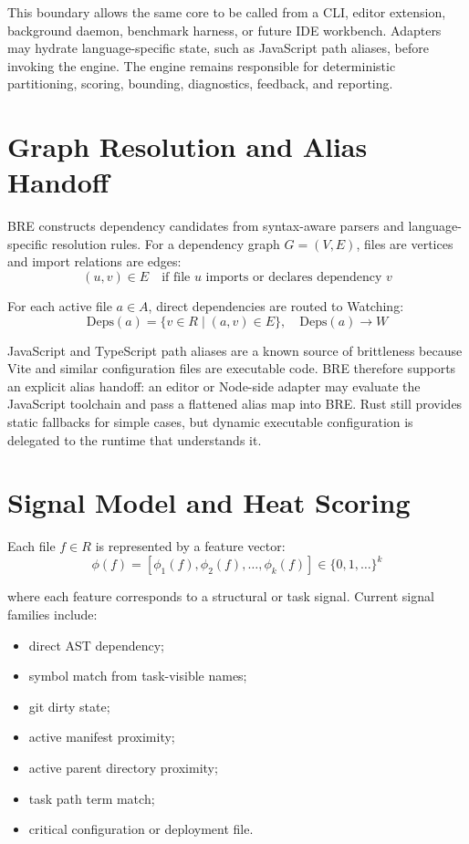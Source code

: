 \documentclass[10pt,twocolumn,letterpaper]{article}
\begin{document}
This boundary allows the same core to be called from a CLI, editor extension, background daemon, benchmark harness, or future IDE workbench. Adapters may hydrate language-specific state, such as JavaScript path aliases, before invoking the engine. The engine remains responsible for deterministic partitioning, scoring, bounding, diagnostics, feedback, and reporting.

\section{Graph Resolution and Alias Handoff}
BRE constructs dependency candidates from syntax-aware parsers and language-specific resolution rules. For a dependency graph $G=(V,E)$, files are vertices and import relations are edges:
\begin{equation}
(u,v) \in E \quad \text{if file } u \text{ imports or declares dependency } v
\end{equation}

For each active file $a \in A$, direct dependencies are routed to Watching:
\begin{equation}
\text{Deps}(a) = \{v \in R \mid (a,v) \in E\}, \quad \text{Deps}(a) \to W
\end{equation}

JavaScript and TypeScript path aliases are a known source of brittleness because Vite and similar configuration files are executable code. BRE therefore supports an explicit alias handoff: an editor or Node-side adapter may evaluate the JavaScript toolchain and pass a flattened alias map into BRE. Rust still provides static fallbacks for simple cases, but dynamic executable configuration is delegated to the runtime that understands it.

\section{Signal Model and Heat Scoring}
Each file $f \in R$ is represented by a feature vector:
\begin{equation}
\phi(f) = [\phi_1(f), \phi_2(f), \dots, \phi_k(f)] \in \{0,1,\dots\}^k
\end{equation}

\noindent where each feature corresponds to a structural or task signal. Current signal families include:
\begin{itemize}
    \item direct AST dependency;
    \item symbol match from task-visible names;
    \item git dirty state;
    \item active manifest proximity;
    \item active parent directory proximity;
    \item task path term match;
    \item critical configuration or deployment file.
\end{itemize}
\end{document}
